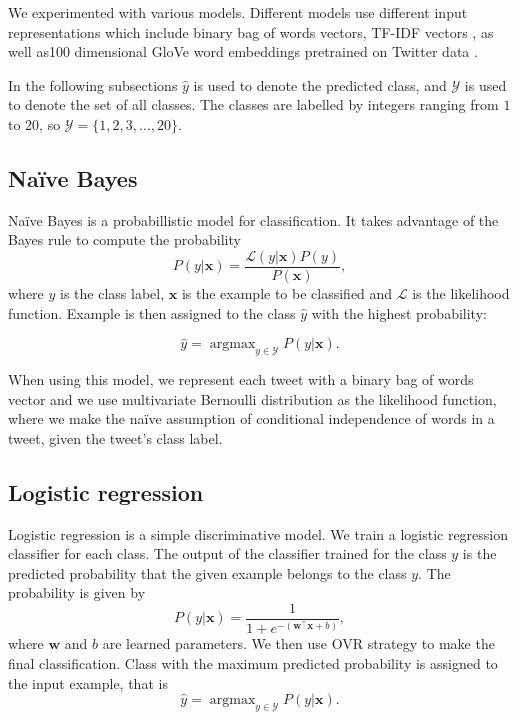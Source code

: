 \documentclass[10pt, a4paper]{article}
\DeclareMathOperator*{\argmax}{argmax}
\begin{document}
We experimented with various models. Different models use different input 
representations which include binary bag of words vectors, TF-IDF vectors 
\citep{manning2008introduction}, as well as100 dimensional GloVe word embeddings
pretrained on Twitter data \citep{pennington2014glove}.

In the following subsections $\hat{y}$ is used to denote the predicted class, 
and $\mathcal{Y}$ is used to denote the set of all classes. The classes are 
labelled by integers ranging from $1$ to $20$, so $\mathcal{Y} = \{1, 2, 3,
\ldots, 20\}$.

\subsection{Na\"{i}ve Bayes}

Na\"{i}ve Bayes \citep{manning2008introduction} is a probabillistic model for 
classification. It takes advantage of the Bayes rule to compute the probability 
$$P(y|\mathbf{x}) = \frac{\mathcal{L}(y|\mathbf{x}) P(y)}{P(\mathbf{x})},$$
where $y$ is the class label, $\mathbf{x}$ is the example to be classified and 
$\mathcal{L}$ is the likelihood function. Example is then assigned to the class 
$\hat{y}$ with the highest probability:

$$\hat{y} = \argmax_{y \in \mathcal{Y}} P(y|\mathbf{x}).$$

When using this model, we represent each tweet with a binary bag of words vector
and we use multivariate Bernoulli distribution as the likelihood function, where
we make the na\"{i}ve assumption of conditional independence of words in a 
tweet, given the tweet's class label.

\subsection{Logistic regression}

Logistic regression \citep{murphy2012machine} is a simple discriminative model.
We train a logistic regression classifier for each class. The output of the 
classifier trained for the class $y$ is the predicted probability that the given
example belongs to the class $y$. The probability is given by
$$P(y|\mathbf{x}) = \frac{1}{1 + e^{-(\mathbf{w}^\top \mathbf{x} + b)}},$$
where $\mathbf{w}$ and $b$ are learned parameters. We then use OVR strategy 
\citep{bishop2006pattern} to make the final classification. Class with the 
maximum predicted probability is assigned to the input example, that is 
$$\hat{y} = \argmax_{y \in \mathcal{Y}} P(y|\mathbf{x}).$$
\end{document}
